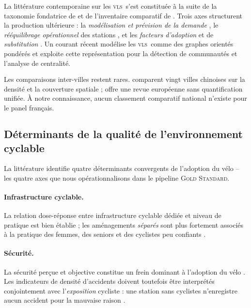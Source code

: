 \documentclass[11pt,a4paper]{article}
\newcommand{\VLS}{\textsc{vls}\xspace}
\newcommand{\GS}{\textsc{Gold Standard}\xspace}
\begin{document}
La littérature contemporaine sur les \VLS\ s'est constituée à la
suite de la taxonomie fondatrice de \citet{DeMaio2009} et de
l'inventaire comparatif de \citet{Shaheen2010}. Trois axes
structurent la production ultérieure : la \emph{modélisation et
prévision de la demande} \citep{FaghihImani2014, FaghihImani2015,
Vogel2011, Hampshire2012}, le \emph{rééquilibrage opérationnel}
des stations \citep{Raviv2013, Forma2015}, et les \emph{facteurs
d'adoption} et de \emph{substitution} \citep{Buck2013,
Fishman2013, Fishman2016, Eren2020}. Un courant récent modélise
les \VLS\ comme des graphes orientés pondérés \citep{Borgnat2011,
Etienne2014, Saberi2018} et exploite cette représentation pour
la détection de communautés et l'analyse de centralité.

Les comparaisons inter-villes restent rares. \citet{Gu2019}
comparent vingt villes chinoises sur la densité et la couverture
spatiale ; \citet{Fishman2016} offre une revue européenne sans
quantification unifiée. À notre connaissance, aucun classement
comparatif national n'existe pour le panel français.

\subsection{Déterminants de la qualité de l'environnement cyclable}

La littérature identifie quatre déterminants convergents de
l'adoption du vélo -- les quatre axes que nous opérationnalisons
dans le pipeline \GS.

\paragraph{Infrastructure cyclable.}
La relation dose-réponse entre infrastructure cyclable dédiée et
niveau de pratique est bien établie \citep{Pucher2010, Heinen2010,
Buehler2012, Garrard2008, Schoner2014} ; les aménagements
\emph{séparés} sont plus fortement associés à la pratique des
femmes, des seniors et des cyclistes peu confiants
\citep{Garrard2012, Heinen2018, Aldred2016}.

\paragraph{Sécurité.}
La sécurité perçue et objective constitue un frein dominant à
l'adoption du vélo \citep{Garrard2012, Reynolds2009, Pucher2010,
Aldred2016}. Les indicateurs de densité d'accidents doivent
toutefois être interprétés conjointement avec l'\emph{exposition}
cycliste : une station sans cyclistes n'enregistre aucun accident
pour la mauvaise raison \citep{Reynolds2009, Schepers2014}.
\end{document}
